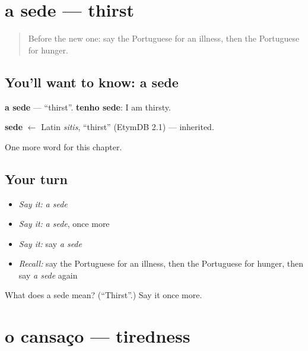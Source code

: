 \section[a sede]{a sede — thirst}

\label{lesson:PT-C35-sede}



\begin{quote}
Before the new one: say the Portuguese for an illness, then the Portuguese for hunger.
\end{quote}

\subsection*{You'll want to know: a sede}
\textbf{a sede} — \textquotedblleft{}thirst\textquotedblright{}. \textbf{tenho sede}: I am thirsty.

\begin{cousinweb}
\textbf{sede} $\leftarrow$ Latin \emph{sitis}, \textquotedblleft{}thirst\textquotedblright{} (EtymDB 2.1) — inherited.
\end{cousinweb}

\begin{grammarlens}[title={What you've built}]
One more word for this chapter.
\end{grammarlens}

\subsection*{Your turn}
\begin{itemize}
\raggedright
  \item \emph{Say it:} \emph{a sede}
  \item \emph{Say it:} \emph{a sede}, once more
  \item \emph{Say it:} say \emph{a sede}
  \item \emph{Recall:} say the Portuguese for an illness, then the Portuguese for hunger, then say \emph{a sede} again
\end{itemize}

\begin{tcolorbox}[breakable,colback=teal!4,colframe=teal!35!black,title={Before you move on}]
What does a sede mean? (\textquotedblleft{}Thirst\textquotedblright{}.) Say it once more.
\end{tcolorbox}
\section[o cansaço]{o cansaço — tiredness}

